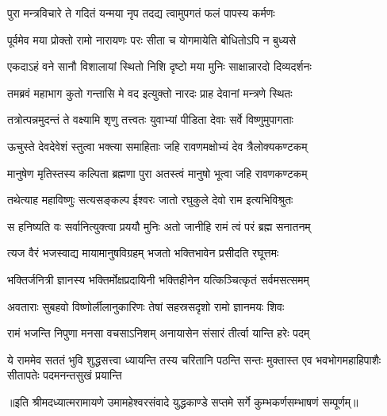 


\addtocounter{shlokacount}{56}


\twolineshloka
{पुरा मन्त्रविचारे ते गदितं यन्मया नृप}
{तदद्य त्वामुपगतं फलं पापस्य कर्मणः} %

\twolineshloka
{पूर्वमेव मया प्रोक्तो रामो नारायणः परः}
{सीता च योगमायेति बोधितोऽपि न बुध्यसे} %

\twolineshloka
{एकदाऽहं वने सानौ विशालायां स्थितो निशि}
{दृष्टो मया मुनिः साक्षान्नारदो दिव्यदर्शनः} %

\twolineshloka
{तमब्रवं महाभाग कुतो गन्तासि मे वद}
{इत्युक्तो नारदः प्राह देवानां मन्त्रणे स्थितः} %

\twolineshloka
{तत्रोत्पन्नमुदन्तं ते वक्ष्यामि शृणु तत्त्वतः}
{युवाभ्यां पीडिता देवाः सर्वे विष्णुमुपागताः} %

\twolineshloka
{ऊचुस्ते देवदेवेशं स्तुत्वा भक्त्या समाहिताः}
{जहि रावणमक्षोभ्यं देव त्रैलोक्यकण्टकम्} %

\twolineshloka
{मानुषेण मृतिस्तस्य कल्पिता ब्रह्मणा पुरा}
{अतस्त्वं मानुषो भूत्वा जहि रावणकण्टकम्} %

\twolineshloka
{तथेत्याह महाविष्णुः सत्यसङ्कल्प ईश्वरः}
{जातो रघुकुले देवो राम इत्यभिविश्रुतः} %

\twolineshloka
{स हनिष्यति वः सर्वानित्युक्त्वा प्रययौ मुनिः}
{अतो जानीहि रामं त्वं परं ब्रह्म सनातनम्} %

\twolineshloka
{त्यज वैरं भजस्वाद्य मायामानुषविग्रहम्}
{भजतो भक्तिभावेन प्रसीदति रघूत्तमः} %

\twolineshloka
{भक्तिर्जनित्री ज्ञानस्य भक्तिर्मोक्षप्रदायिनी}
{भक्तिहीनेन यत्किञ्चित्कृतं सर्वमसत्समम्} %

\twolineshloka
{अवताराः सुबहवो विष्णोर्लीलानुकारिणः}
{तेषां सहस्रसदृशो रामो ज्ञानमयः शिवः} %

\twolineshloka
{रामं भजन्ति निपुणा मनसा वचसाऽनिशम्}
{अनायासेन संसारं तीर्त्वा यान्ति हरेः पदम्} %

\fourlineindentedshloka
{ये राममेव सततं भुवि शुद्धसत्त्वा}
{ध्यायन्ति तस्य चरितानि पठन्ति सन्तः}
{मुक्तास्त एव भवभोगमहाहिपाशैः}
{सीतापतेः पदमनन्तसुखं प्रयान्ति} %

{॥इति श्रीमदध्यात्मरामायणे उमामहेश्वरसंवादे युद्धकाण्डे सप्तमे
 सर्गे कुम्भकर्णसम्भाषणं सम्पूर्णम्॥}
